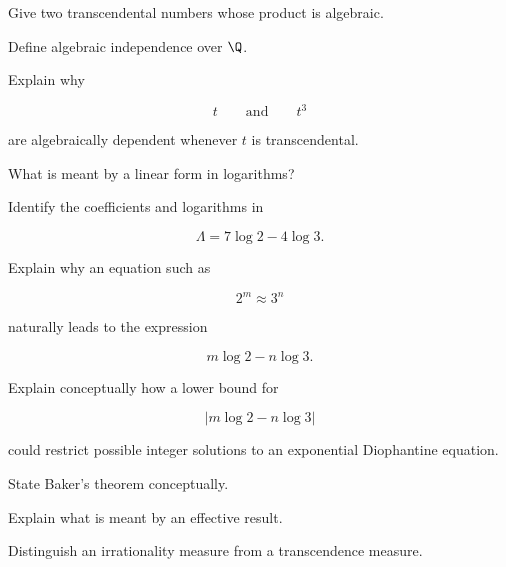 \begin{exercise}[2]
Give two transcendental numbers whose product is algebraic.
\end{exercise}

\begin{exercise}[2]
Define algebraic independence over \(\Q\).
\end{exercise}

\begin{exercise}[2]
Explain why

\[ t\qquad\text{and}\qquad t^3 \]

are algebraically dependent whenever \(t\) is transcendental.
\end{exercise}

\begin{exercise}[2]
What is meant by a linear form in logarithms?
\end{exercise}

\begin{exercise}[2]
Identify the coefficients and logarithms in

\[ \Lambda=7\log2-4\log3. \]
\end{exercise}

\begin{exercise}[2]
Explain why an equation such as

\[ 2^m\approx3^n \]

naturally leads to the expression

\[ m\log2-n\log3. \]
\end{exercise}

\begin{exercise}[3]
Explain conceptually how a lower bound for

\[ |m\log2-n\log3| \]

could restrict possible integer solutions to an exponential Diophantine
equation.
\end{exercise}

\begin{exercise}[2]
State Baker's theorem conceptually.
\end{exercise}

\begin{exercise}[2]
Explain what is meant by an effective result.
\end{exercise}

\begin{exercise}[2]
Distinguish an irrationality measure from a transcendence measure.
\end{exercise}

